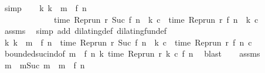 \begin{isabellebody}
\ simp\isanewline
\ \ \isamarkupfalse%
\ {\isacartoucheopen}{\isasymforall}k{\isachardot}\ k\ {\isacharless}\ m\ {\isacharminus}\ {\isacharparenleft}f\ n{\isacharparenright}\isanewline
\ \ \ \ \ \ \ \ \ \ \ \ {\isasymlongrightarrow}\ time\ {\isacharparenleft}{\isacharparenleft}Rep{\isacharunderscore}run\ r{\isacharparenright}\ {\isacharparenleft}Suc\ {\isacharparenleft}{\isacharparenleft}f\ n{\isacharparenright}\ {\isacharplus}\ k{\isacharparenright}{\isacharparenright}\ c{\isacharparenright}\ {\isacharequal}\ time\ {\isacharparenleft}{\isacharparenleft}Rep{\isacharunderscore}run\ r{\isacharparenright}\ {\isacharparenleft}{\isacharparenleft}f\ n{\isacharparenright}\ {\isacharplus}\ k{\isacharparenright}\ c{\isacharparenright}{\isacartoucheclose}\isanewline
\ \ \ \ \isamarkupfalse%
\ assms{\isacharparenleft}{}{\isacharparenright}\ \isamarkupfalse%
\ {\isacharparenleft}simp\ add{\isacharcolon}\ dilating{\isacharunderscore}def\ dilating{\isacharunderscore}fun{\isacharunderscore}def{\isacharparenright}\isanewline
\ \ \isamarkupfalse%
\ {\isacharasterisk}{\isacharcolon}{\isacartoucheopen}{\isasymforall}k{\isachardot}\ k\ {\isacharless}\ m\ {\isacharminus}\ {\isacharparenleft}f\ n{\isacharparenright}\ {\isasymlongrightarrow}\ time\ {\isacharparenleft}{\isacharparenleft}Rep{\isacharunderscore}run\ r{\isacharparenright}\ {\isacharparenleft}Suc\ {\isacharparenleft}{\isacharparenleft}f\ n{\isacharparenright}\ {\isacharplus}\ k{\isacharparenright}{\isacharparenright}\ c{\isacharparenright}\ {\isacharequal}\ time\ {\isacharparenleft}{\isacharparenleft}Rep{\isacharunderscore}run\ r{\isacharparenright}\ {\isacharparenleft}f\ n{\isacharparenright}\ c{\isacharparenright}{\isacartoucheclose}\isanewline
\ \ \ \ \isamarkupfalse%
\ bounded{\isacharunderscore}suc{\isacharunderscore}ind{\isacharbrackleft}of\ {\isacartoucheopen}m\ {\isacharminus}\ {\isacharparenleft}f\ n{\isacharparenright}{\isacartoucheclose}\ {\isacartoucheopen}{\isasymlambda}k{\isachardot}\ time\ {\isacharparenleft}Rep{\isacharunderscore}run\ r\ k\ c{\isacharparenright}{\isacartoucheclose}\ {\isacartoucheopen}f\ n{\isacartoucheclose}{\isacharbrackright}\ \isamarkupfalse%
\ blast\isanewline
\ \ \isamarkupfalse%
\ assms{\isacharparenleft}{}{\isacharparenright}\ \isamarkupfalse%
\ m\ \ m{}{\isacharcolon}{\isacartoucheopen}Suc\ m\ {\isacharequal}\ m\ {\isacharminus}\ {\isacharparenleft}f\ n{\isacharparenright}{\isacartoucheclose}\ \isamarkupfalse%

\end{isabellebody}
